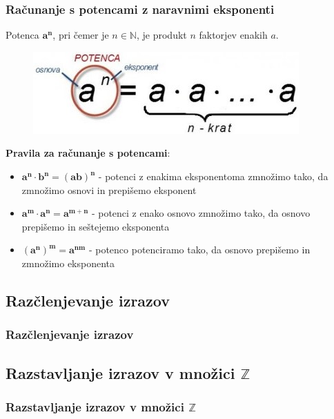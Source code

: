         \begin{frame}
            \frametitle{Računanje s potencami z naravnimi eksponenti}

            Potenca $\mathbf{a^n}$, pri čemer je $n \in \mathbb{N}$, je produkt $n$ faktorjev enakih $a$.

            \begin{figure}
                \includegraphics[scale=0.5]{Slike in skice/Potenca.jpg}
            \end{figure}
    
            \textbf{Pravila za računanje s potencami}:
            \begin{itemize}
                \item $\mathbf{a^n \cdot b^n = (ab)^n}$ - potenci z enakima eksponentoma zmnožimo tako, da zmnožimo osnovi in prepišemo eksponent
                \item $\mathbf{a^m \cdot a^n = a^{m+n}}$ - potenci z enako osnovo zmnožimo tako, da osnovo prepišemo in seštejemo eksponenta
                \item $\mathbf{(a^n)^m = a^{nm}}$ - potenco potenciramo tako, da osnovo prepišemo in zmnožimo eksponenta
            \end{itemize}

        \end{frame}

    \subsection{Razčlenjevanje izrazov}

        \begin{frame}
            \frametitle{Razčlenjevanje izrazov}
        \end{frame}

    \subsection{Razstavljanje izrazov v množici $\mathbb{Z}$}

        \begin{frame}
            \frametitle{Razstavljanje izrazov v množici $\mathbb{Z}$}
        \end{frame}


